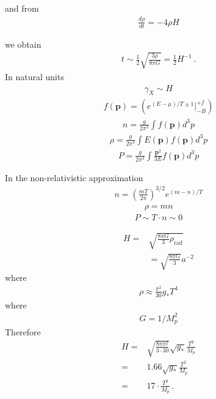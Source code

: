 \documentclass[12pt,letterpaper]{article}
\begin{document}
and from
\begin{align*}
  \frac{d\rho}{dt}=-4\rho H
\end{align*}


we obtain
\begin{align*}
  t\sim \frac{1}{2}\sqrt{\frac{3\rho}{8\pi G}}=\frac{1}{2}H^{-1}\,.
\end{align*}
In natural units
\begin{align*}
  \gamma_X\sim H
\end{align*}
\begin{align*}
  f(\mathbf{p})=
  \left(
   e^{(E-\mu)/T\pm 1}|_{-B}^{+f}
  \right)
\end{align*}
\begin{align*}
  n=\frac{g}{2\pi^3}\int f(\mathbf{p})d^3p
\end{align*}
\begin{align*}
  \rho=\frac{g}{2\pi^3}\int E(\mathbf{p}) f(\mathbf{p})d^3p
\end{align*}
\begin{align*}
  P=\frac{g}{2\pi^3}\int \frac{\mathbf{p}^2}{3E} f(\mathbf{p})d^3p
\end{align*}

In the non-relativistic approximation
\begin{align*} 
n=
\left(
\frac{mT}{2\pi}
\right)^{3/2} e^{(m-n)/T}
\end{align*}
\begin{align*}
  \rho=mn
\end{align*}
\begin{align*}
  P\sim T\cdot n\sim 0
\end{align*}

\begin{align*}
   H=&\sqrt{\frac{8\pi G}{3}\rho_\text{rad}}\nonumber\\
&=\sqrt{\frac{8\pi G}{3}}a^{-2}
\end{align*}
where
\begin{align*}
  \rho\approx \frac{\pi^2}{30}g_* T^4
\end{align*}
where
\begin{align*}
  G=1/M_p^2
\end{align*}
Therefore
\begin{align*}
  H=&\sqrt{\frac{8\pi\pi^2}{3\cdot 30}}\sqrt{g_*}\frac{T^2}{M_p}\nonumber\\
=& 1.66\sqrt{g_*}\frac{T^2}{M_p}\nonumber\\
=&17\cdot \frac{T^2}{M_p}\,.
\end{align*}
\end{document}
